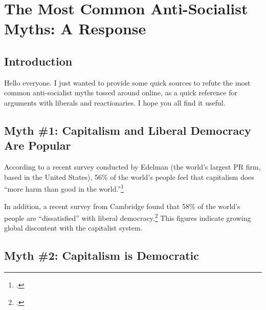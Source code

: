 \section[The Most Common Anti-Socialist Myths]{The Most Common Anti-Socialist Myths: A Response\\}
\subsection*{Introduction}

Hello everyone.
I just wanted to provide some quick sources to refute the most common anti-socialist myths tossed around online, as a quick reference for arguments with liberals and reactionaries.
I hope you all find it useful.

\subsection*{Myth \#1: Capitalism and Liberal Democracy Are Popular}

According to a recent survey conducted by Edelman (the world's largest PR firm, based in the United States), 56\% of the world's people feel that capitalism does ``more harm than good in the world.''\footcite{john-capitalism}

In addition, a recent survey from Cambridge found that 58\% of the world's people are ``dissatisfied'' with liberal democracy.\footcite{cambridge}
This figures indicate growing global discontent with the capitalist system.

\subsection*{Myth \#2: Capitalism is Democratic}

